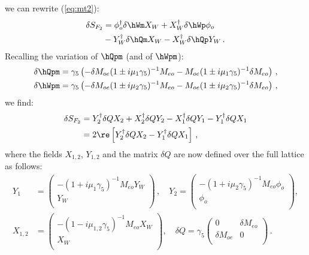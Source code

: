 we can rewrite (\ref{eq:mt2}):
\begin{equation}
  \label{eq:mt4}
  \begin{split}
    \delta S_{F_2} &= \phi_o^\dagger\delta\hWm X_W + X_W^\dagger\delta\hWp\phi_o\\
    &-Y_W^\dagger\delta\hQm X_W - X_W^\dagger\delta\hQp Y_W\, .
  \end{split}
\end{equation}
Recalling the variation of $\hQpm$ (and of $\hWpm$):
\begin{equation}
  \label{eq:mt5}
  \begin{split}
    \delta\hQpm &= \gamma_5\left(-\delta M_{oe}(1\pm i\mu_1\gamma_5 )^{-1}M_{eo} -
      M_{oe}(1\pm i\mu_1\gamma_5 )^{-1}\delta M_{eo}\right)\, , \\
    \delta\hWpm &= \gamma_5\left(-\delta M_{oe}(1\pm i\mu_2\gamma_5 )^{-1}M_{eo} -
      M_{oe}(1\pm i\mu_2\gamma_5)^{-1}\delta M_{eo}\right)\, ,
  \end{split}
\end{equation}
we find:
\begin{equation}
  \label{eq:mt6}
  \begin{split}
    \delta S_{F_2} &= Y_2^\dagger \delta Q X_2 + X_2^\dagger\delta QY_2 -X_1^\dagger\delta Q Y_1 -
    Y_1^\dagger\delta Q X_1\\
    &= 2\re\left[Y_2^\dagger \delta Q X_2 - Y_1^\dagger\delta Q X_1 \right]\, ,
  \end{split}
\end{equation}
where the fields $X_{1,2}$, $Y_{1,2}$ and the matrix $\delta Q$ are now
defined over the full lattice as follows:
\begin{equation}
  \label{eq:mt7}
  \begin{split}
    Y_1 &= 
    \begin{pmatrix}
      -(1+i\mu_{1}\gamma_5)^{-1}M_{eo}Y_W \\ Y_W\\
    \end{pmatrix}\, ,\quad
    Y_2 = 
    \begin{pmatrix}
      -(1+i\mu_{2}\gamma_5)^{-1}M_{eo}\phi_o \\ \phi_o\\
    \end{pmatrix},\\
    X_{1,2} &= 
    \begin{pmatrix}
      -(1-i\mu_{1,2}\gamma_5)^{-1}M_{eo}X_W \\ X_W\\
    \end{pmatrix},\quad
    \delta Q = \gamma_5
    \begin{pmatrix}
      0 & \delta M_{eo}\\
      \delta M_{oe} & 0\\
    \end{pmatrix}\, .
  \end{split}
\end{equation}
